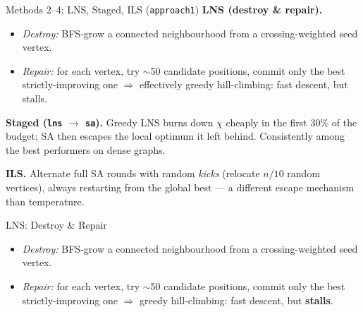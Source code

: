 \begin{frame}{Methods 2--4: LNS, Staged, ILS (\texttt{approach1})}
  \textbf{LNS (destroy \& repair).}
  \begin{itemize}
    \item \emph{Destroy:} BFS-grow a connected neighbourhood from a crossing-weighted seed vertex.
    \item \emph{Repair:} for each vertex, try $\sim$50 candidate positions, commit only the best
          strictly-improving one $\Rightarrow$ effectively greedy hill-climbing: fast descent, but stalls.
  \end{itemize}
  \medskip
  \textbf{Staged (\texttt{lns} $\to$ \texttt{sa}).} Greedy LNS burns down $\chi$ cheaply in the first
  30\% of the budget; SA then escapes the local optimum it left behind. Consistently among the best
  performers on dense graphs.
  \medskip

  \textbf{ILS.} Alternate full SA rounds with random \emph{kicks} (relocate $n/10$ random vertices),
  always restarting from the global best --- a different escape mechanism than temperature.
\end{frame}


\begin{frame}{LNS: Destroy \& Repair}
  \begin{itemize}
    \item \emph{Destroy:} BFS-grow a connected neighbourhood from a crossing-weighted seed vertex.
    \item \emph{Repair:} for each vertex, try $\sim$50 candidate positions, commit only the best
          strictly-improving one $\Rightarrow$ greedy hill-climbing: fast descent, but \textbf{stalls}.
  \end{itemize}
  \vfill
  \centering
\end{frame}


